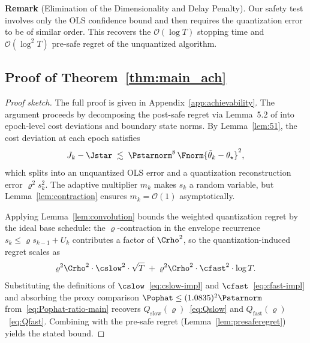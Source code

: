 \documentclass[11pt,journal,onecolumn]{IEEEtran}
\begin{document}
\noindent\textbf{Remark} (Elimination of the Dimensionality and Delay Penalty).
    Our safety test involves only the OLS confidence bound and then requires the quantization error to be of similar order. This recovers the $\mathcal{O}(\log T)$ stopping time and $\mathcal{O}(\log^2 T)$ pre-safe regret of the unquantized algorithm.

\subsection{Proof of Theorem~\ref{thm:main_ach}}

\begin{proof}[Proof sketch]
    The full proof is given in Appendix~\ref{app:achievability}. The argument proceeds by decomposing the post-safe regret via Lemma~5.2 of \cite{simchowitz20a} into epoch-level cost deviations and boundary state norms. By Lemma~\ref{lem:51}, the cost deviation at each epoch satisfies
    \begin{equation}
        J_k - \Jstar \;\lesssim\; \Pstarnorm^8 \,\Fnorm{\tilde\theta_k - \theta_\star}^2,
    \end{equation}
    which splits into an unquantized OLS error and a quantization reconstruction error $\varrho^2 s_k^2$. The adaptive multiplier $m_k$ makes $s_k$ a random variable, but Lemma~\ref{lem:contraction} ensures $m_k = \mathcal{O}(1)$ asymptotically.

    Applying Lemma~\ref{lem:convolution} bounds the weighted quantization regret by the ideal base schedule: the $\varrho$-contraction in the envelope recurrence $s_k \le \varrho s_{k-1} + U_k$ contributes a factor of $\Crho^2$, so the quantization-induced regret scales as
    \begin{equation}
        \varrho^2 \Crho^2 \cdot \cslow^2 \cdot \sqrt{T} \;+\; \varrho^2 \Crho^2 \cdot \cfast^2 \cdot \log T.
    \end{equation}
    Substituting the definitions of $\cslow$~\eqref{eq:cslow-impl} and $\cfast$~\eqref{eq:cfast-impl} and absorbing the proxy comparison $\Pophat \le (1.0835)^2 \Pstarnorm$ from~\eqref{eq:Pophat-ratio-main} recovers $Q_{\mathrm{slow}}(\varrho)$~\eqref{eq:Qslow} and $Q_{\mathrm{fast}}(\varrho)$~\eqref{eq:Qfast}. Combining with the pre-safe regret (Lemma~\ref{lem:presaferegret}) yields the stated bound.
\end{proof}
\end{document}
